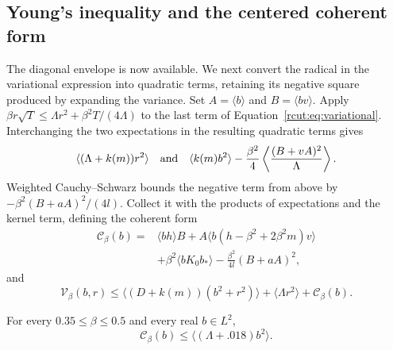 \subsection{Young's inequality and the centered coherent form}
\label{rcut:sec:scalar-reduction}

The diagonal envelope is now available. We next convert the radical
in the variational expression into quadratic terms, retaining its
negative square produced by expanding the variance. Set \(A=\langle b\rangle\) and
\(B=\langle bv\rangle\). Apply
\(\beta r\sqrt{T}\leq \Lambda{}r^2+\beta^2T/(4\Lambda{})\) to the last
term of Equation~\eqref{rcut:eq:variational}. Interchanging the two
expectations in the resulting quadratic terms gives
\[
 \langle(\Lambda{}+k(m))r^2\rangle
 \quad\hbox{and}\quad
 \langle k(m)b^2\rangle
   -\frac{\beta^2}{4}\left\langle\frac{(B+vA)^2}{\Lambda{}}\right\rangle.
\]
Weighted Cauchy--Schwarz bounds the negative term from above by
\(-\beta^2(B+aA)^2/(4l)\). Collect it with the products of expectations
and the kernel term, defining the coherent form
\begin{equation}
 \begin{split}
 \mathcal C_\beta(b)={}&\langle bh\rangle B
 +A\langle b(h-\beta^2+2\beta^2m)v\rangle\\
 &+\beta^2\langle bK_0b_*\rangle
 -\frac{\beta^2}{4l}(B+aA)^2,
 \end{split}
 \label{rcut:eq:scalar-coherent}
\end{equation}
and
\begin{equation}
 \mathcal V_\beta(b,r)
 \leq\langle(D+k(m))(b^2+r^2)\rangle
       +\langle \Lambda{}r^2\rangle+\mathcal C_\beta(b).
 \label{rcut:eq:scalar-young}
\end{equation}

\begin{lemma}
\label{rcut:lem:scalar-coherent}
For every \(0.35\leq\beta\leq0.5\) and every real \(b\in L^2\),
\begin{equation}
 \mathcal C_\beta(b)\leq\langle(\Lambda{}+.018)b^2\rangle.
 \label{rcut:eq:scalar-coherent-bound}
\end{equation}
\end{lemma}


